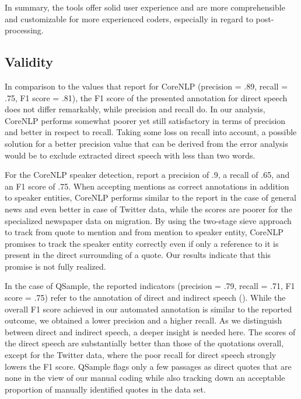 \documentclass{ccr}
\begin{document}
In summary, the tools offer solid user experience and are
more comprehensible and customizable for more experienced coders,
especially in regard to post-processing.

\subsection{Validity}

In comparison to the values that \textcite{muzny2017two} report for CoreNLP
(precision = .89, recall = .75, F1 score = .81), the F1 score of the presented
annotation for direct speech does not differ remarkably, while precision
and recall do. In our analysis, CoreNLP performs somewhat poorer yet
still satisfactory in terms of precision and better in respect to
recall. Taking some loss on recall into account, a possible solution for
a better precision value that can be derived from the error analysis
would be to exclude extracted direct speech with less than two words.

For the CoreNLP speaker detection, \textcite{muzny2017two} report a
precision of .9, a recall of .65, and an F1 score of .75. When accepting
mentions as correct annotations in addition to speaker entities, CoreNLP
performs similar to the report in the case of general news and even
better in case of Twitter data, while the scores are poorer for the specialized newspaper data on migration. By using the two-stage sieve approach to
track from quote to mention and from mention to speaker entity, CoreNLP
promises to track the speaker entity correctly even if only a reference
to it is present in the direct surrounding of a quote. Our results
indicate that this promise is not fully realized.

In the case of QSample, the reported indicators (precision = .79, recall
= .71, F1 score = .75) refer to the annotation of direct and indirect
speech (\cite{scheible2016model}). While the overall F1 score achieved in
our automated annotation is similar to the reported outcome, we obtained
a lower precision and a higher recall. As we distinguish between direct
and indirect speech, a deeper insight is needed here. The scores of the
direct speech are substantially better than those of the quotations
overall, except for the Twitter data, where the poor recall for direct
speech strongly lowers the F1 score. QSample flags only a few passages
as direct quotes that are none in the view of our manual coding while
also tracking down an acceptable proportion of manually identified
quotes in the data set.
\end{document}
